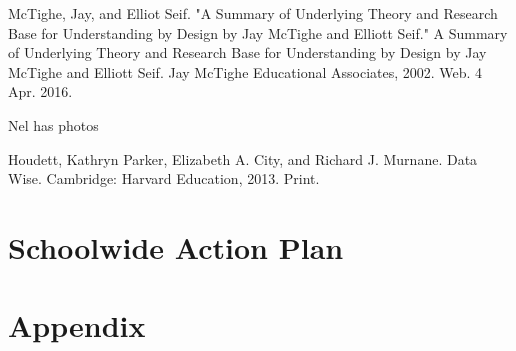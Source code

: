 \documentclass{report}
\begin{document}
\begin{evidence}
\item McTighe, Jay, and Elliot Seif. "A Summary of Underlying Theory and Research Base for Understanding by Design by Jay McTighe and Elliott Seif." A Summary of Underlying Theory and Research Base for Understanding by Design by Jay McTighe and Elliott Seif. Jay McTighe Educational Associates, 2002. Web. 4 Apr. 2016. 
\item Nel has photos
\item Houdett, Kathryn Parker, Elizabeth A. City, and Richard J. Murnane. Data Wise. Cambridge: Harvard Education, 2013. Print.
\end{evidence}

\chapter{Schoolwide Action Plan}
\chapter{Appendix}
\listoffigures
\listoftables
\end{document}
